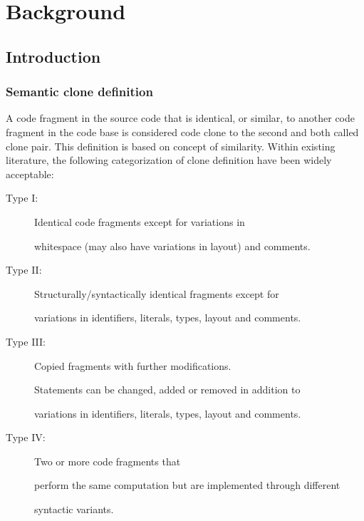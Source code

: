 \chapter{Background}
\section{Introduction}

\subsection{Semantic clone definition}



A code fragment in the source code that is identical, or similar, to another code fragment in the code base is considered code clone to the second and both called clone pair. This definition is based on concept of similarity. Within existing literature, the following categorization of clone definition have been widely acceptable:  



\begin{description}
	
	
	
	\item [Type I:] Identical code fragments except for variations in
	
	whitespace (may also have variations in layout) and comments. 
	
	
	
	\item[Type II:] Structurally/syntactically identical fragments except for
	
	variations in identifiers, literals, types, layout and comments.
	
	
	
	\item [Type III:] Copied fragments with further modifications.
	
	Statements can be changed, added or removed in addition to
	
	variations in identifiers, literals, types, layout and comments.
	
	
	
	
	
	
	\item [Type IV:] Two or more code fragments that
	
	perform the same computation but are implemented through different
	
	syntactic variants. 
	
	
	
\end{description}



